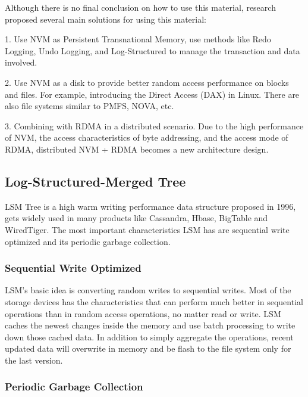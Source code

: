 
Although there is no final conclusion on how to use this material, research proposed several main solutions for using this material: 

1. Use NVM as Persistent Transnational Memory, use methods like Redo Logging, Undo Logging, and Log-Structured to manage the transaction and data involved. 

2. Use NVM as a disk to provide better random access performance on blocks and files. For example, introducing the Direct Access (DAX) in Linux. There are also file systems\cite{dulloor2014system} similar to PMFS, NOVA\cite{xu2016nova}, etc.

3. Combining with RDMA in a distributed scenario. Due to the high performance of NVM, the access characteristics of byte addressing, and the access mode of RDMA, distributed NVM + RDMA becomes a new architecture design.


\subsection{Log-Structured-Merged Tree}\label{LSM-introduction}
LSM Tree is a high warm writing performance data structure proposed in 1996\cite{o1996log}, gets widely used in many products like  Cassandra\cite{ApacheCa22:online}, Hbase\cite{ApacheHB26:online}, BigTable\cite{chang2008bigtable} and WiredTiger\cite{WiredTig38:online}.  The most important characteristics LSM has are sequential write optimized and its periodic garbage collection.

\subsubsection{Sequential Write Optimized} 

LSM's basic idea is converting random writes to sequential writes. Most of the storage devices has the characteristics that can perform much better in sequential operations than in random access operations, no matter read or write. LSM caches the newest changes inside the memory and use batch processing to write down those cached data. In addition to simply aggregate the operations, recent updated data will overwrite in
memory and be flash to the file system only for the last version.

\subsubsection{Periodic Garbage Collection} 

